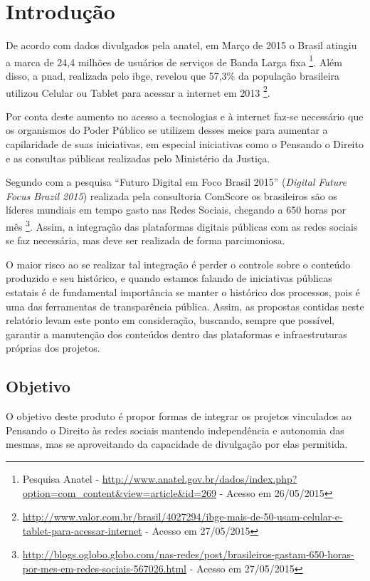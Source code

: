 \chapter{Introdução}
De acordo com dados divulgados pela \gls{anatel}, em Março de 2015 o Brasil atingiu a marca de 24,4 milhões de usuários de serviços de Banda Larga fixa%
\footnote{Pesquisa Anatel - \url{http://www.anatel.gov.br/dados/index.php?option=com_content&view=article&id=269} - Acesso em 26/05/2015}.
%
Além disso, a \gls{pnad}, realizada pelo \gls{ibge}, revelou que 57,3\% da população brasileira utilizou Celular ou Tablet para acessar a internet em 2013%
\footnote{\url{http://www.valor.com.br/brasil/4027294/ibge-mais-de-50-usam-celular-e-tablet-para-acessar-internet} - Acesso em 27/05/2015}.

Por conta deste aumento no acesso a tecnologias e à internet faz-se necessário que os organismos do Poder Público se utilizem desses meios para aumentar a capilaridade de suas iniciativas, em especial iniciativas como o Pensando o Direito e as consultas públicas realizadas pelo Ministério da Justiça.

Segundo com a pesquisa ``Futuro Digital em Foco Brasil 2015'' (\textit{Digital Future Focus Brazil 2015}) realizada pela consultoria ComScore os brasileiros são os líderes mundiais em tempo gasto nas Redes Sociais, chegando a 650 horas por mês%
\footnote{\url{http://blogs.oglobo.globo.com/nas-redes/post/brasileiros-gastam-650-horas-por-mes-em-redes-sociais-567026.html} - Acesso em 27/05/2015}. Assim, a integração das plataformas digitais públicas com as redes sociais se faz necessária, mas deve ser realizada de forma parcimoniosa.

O maior risco ao se realizar tal integração é perder o controle sobre o conteúdo produzido e seu histórico, e quando estamos falando de iniciativas públicas estatais é de fundamental importância se manter o histórico dos processos, pois é uma das ferramentas de transparência pública. Assim, as propostas contidas neste relatório levam este ponto em consideração, buscando, sempre que possível, garantir a manutenção dos conteúdos dentro das plataformas e infraestruturas próprias dos projetos.

\section{Objetivo}
O objetivo deste produto é propor formas de integrar os projetos vinculados ao Pensando o Direito às redes sociais mantendo independência e autonomia das mesmas, mas se aproveitando da capacidade de divulgação por elas permitida.
